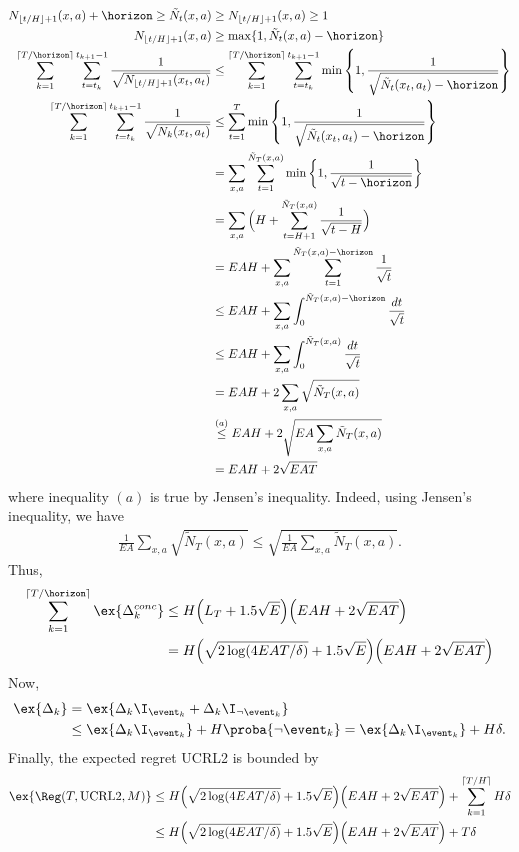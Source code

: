 \begin{align*}
N_{\lfloor t/H\rfloor+1}(x,a) +\horizon \ge \tilde{N}_t(x,a) &\ge N_{\lfloor t/H\rfloor+1}(x,a) \ge 1 \\
N_{\lfloor t/H\rfloor+1}(x,a) &\ge \max\{1, \tilde{N}_t(x,a) -\horizon\} \\
\sum_{k=1}^{\lceil T/\horizon\rceil} \sum_{t=t_k}^{t_{k+1}-1} \frac{1}{\sqrt{N_{\lfloor t/H\rfloor+1}(x_t,a_t)}} &\le \sum_{k=1}^{\lceil T/\horizon\rceil} \sum_{t=t_k}^{t_{k+1}-1} \min\left\{1, \frac{1}{\sqrt{\tilde{N}_t(x_t,a_t) -\horizon}}\right\} \\
\sum_{k=1}^{\lceil T/\horizon\rceil} \sum_{t=t_k}^{t_{k+1}-1} \frac{1}{\sqrt{N_k(x_t,a_t)}} &\le \sum_{t=1}^{T} \min\left\{1, \frac{1}{\sqrt{\tilde{N}_t(x_t,a_t) -\horizon}}\right\} \\
    &= \sum_{x,a} \sum_{t=1}^{\tilde{N}_T(x,a)} \min\left\{1, \frac{1}{\sqrt{t -\horizon}}\right\} \\
    &= \sum_{x,a} \Big(H +\sum_{t=H+1}^{\tilde{N}_T(x,a)} \frac{1}{\sqrt{t -H}}\Big) \\
    &= EAH +\sum_{x,a} \sum_{t=1}^{\tilde{N}_T(x,a) -\horizon} \frac{1}{\sqrt{t}} \\
    &\le EAH +\sum_{x,a} \int_0^{\tilde{N}_T(x,a) -\horizon} \frac{dt}{\sqrt{t}} \\
    &\le EAH +\sum_{x,a} \int_0^{\tilde{N}_T(x,a)} \frac{dt}{\sqrt{t}} \\
    &= EAH +2\sum_{x,a} \sqrt{\tilde{N}_T(x,a)} \\
    &\overset{(a)}\le EAH +2\sqrt{EA \sum_{x,a}\tilde{N}_T(x,a)} \\
    &= EAH +2\sqrt{EAT}
\end{align*}
where inequality $(a)$ is true by Jensen's inequality. Indeed, using Jensen's inequality, we have
\begin{align*}
\frac{1}{EA}\sum_{x,a}\sqrt{\tilde{N}_T(x,a)} \le\sqrt{\frac{1}{EA}\sum_{x,a}\tilde{N}_T(x,a)}.
\end{align*}
Thus,
\begin{align*}
\sum_{k=1}^{\lceil T/\horizon\rceil}\ex{\Delta_k^{conc}}
&\le H\Big(L_T+1.5\sqrt{E}\Big) \Big(EAH +2\sqrt{EAT}\Big) \\
&= H\Big(\sqrt{2\log(4EAT/\delta)} +1.5\sqrt{E}\Big) \Big(EAH +2\sqrt{EAT}\Big)
\end{align*}
Now,
\begin{align*}
\ex{\Delta_k}
&=\ex{\Delta_k\I_{\event_k} +\Delta_k\I_{\neg\event_k}} \\
&\le \ex{\Delta_k\I_{\event_k}} +H\proba{\neg\event_k} =\ex{\Delta_k\I_{\event_k}} +H\delta.
\end{align*}
Finally, the expected regret UCRL2 is bounded by
\begin{align*}
\ex{\Reg(T,\mathrm{UCRL2},M)} 
&\le H\Big(\sqrt{2\log(4EAT/\delta)} +1.5\sqrt{E}\Big) \Big(EAH +2\sqrt{EAT}\Big) +\sum_{k=1}^{\lceil T/H\rceil}H\delta \\
&\le H\Big(\sqrt{2\log(4EAT/\delta)} +1.5\sqrt{E}\Big) \Big(EAH +2\sqrt{EAT}\Big) +T\delta
\end{align*}

